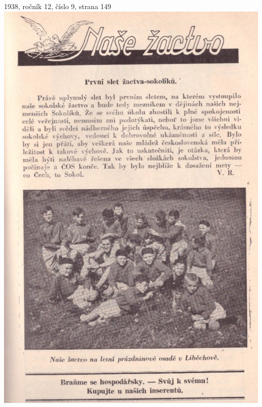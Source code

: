 \documentclass[11pt]{article}
\begin{document}
1938, ročník 12, číslo 9, strana 149 \\
\includegraphics[width=\imagewidth]{original/1938/Skener_20250318 (8).jpg}



\end{document}
